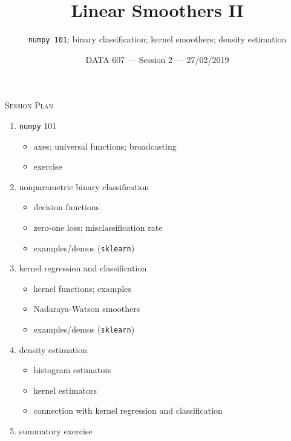 \documentclass{beamer}
\begin{document}
\setlength{\parskip}{1em}
    
\begin{frame}
    \title{Linear Smoothers II}
    \subtitle{\texttt{numpy 101}; binary classification; kernel smoothers; density estimation}
    \date{DATA 607 --- Session 2 --- 27/02/2019}
    \maketitle
\end{frame}


\begin{frame}{\textsc{Session Plan}}
    \begin{enumerate}
        \item \texttt{numpy} 101
        \begin{itemize}
            \item axes; universal functions; broadcasting
            \item exercise
        \end{itemize}
        \item nonparametric binary classification
        \begin{itemize}
            \item decision functions
            \item zero-one loss; misclassification rate
            \item examples/demos (\texttt{sklearn})
        \end{itemize}
        \item kernel regression and classification
        \begin{itemize}
            \item kernel functions; examples
            \item Nadaraya-Watson smoothers
            \item examples/demos (\texttt{sklearn})
        \end{itemize}
        \item density estimation
        \begin{itemize}
            \item histogram estimators
            \item kernel estimators
            \item connection with kernel regression and classification
        \end{itemize}
        \item summatory exercise
    \end{enumerate}   
\end{frame}
\end{document}
